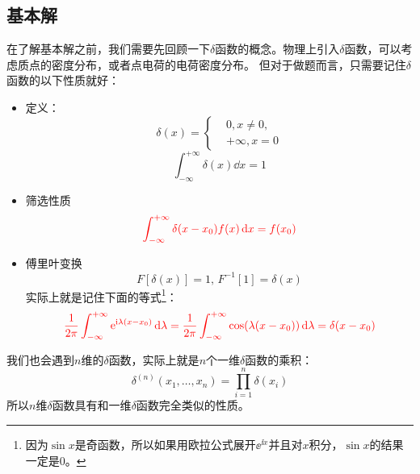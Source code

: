 \subsection{基本解}
在了解基本解之前，我们需要先回顾一下$\delta$函数的概念。物理上引入$\delta$函数，可以考虑质点的密度分布，或者点电荷的电荷密度分布。
但对于做题而言，只需要记住$\delta$函数的以下性质就好：
\begin{itemize}
    \item 定义：
        \begin{equation*}
            \delta(x) = 
            \left\{
                \begin{aligned}
                    &0, x \neq 0,\\
                    &+\infty, x = 0
                \end{aligned}
            \right.
        \end{equation*}
        \[\int_{-\infty}^{+\infty} \delta(x) \dd{x} = 1\]
    \item 筛选性质
        \[{\color{red}{\int_{-\infty}^{+\infty} \delta(x - x_0) f(x) \dd{x} = f(x_0)}}\]
    \item 傅里叶变换
        \[F[\delta(x)] = 1,\, F^{-1}[1] = \delta(x)\]
        实际上就是记住下面的等式\footnote{因为$\sin x$是奇函数，所以如果用欧拉公式展开$\ee^{\ii x}$并且对$x$积分，$\sin x$的结果一定是0。}：
        \[{\color{red}\frac{1}{2 \pi} \int_{-\infty}^{+\infty} \mathrm{e}^{\mathrm{i} \lambda \left(x - x_0\right)} \dd{\lambda} = \frac{1}{2\pi} \int_{-\infty}^{+\infty} \cos(\lambda(x - x_0)) \dd{\lambda} = \delta(x - x_0)}\]
\end{itemize}
我们也会遇到$n$维的$\delta$函数，实际上就是$n$个一维$\delta$函数的乘积：
\[\delta^{\left(n\right)}(x_1, \dots, x_n) = \prod_{i = 1}^{n}\delta(x_i)\]
所以$n$维$\delta$函数具有和一维$\delta$函数完全类似的性质。
